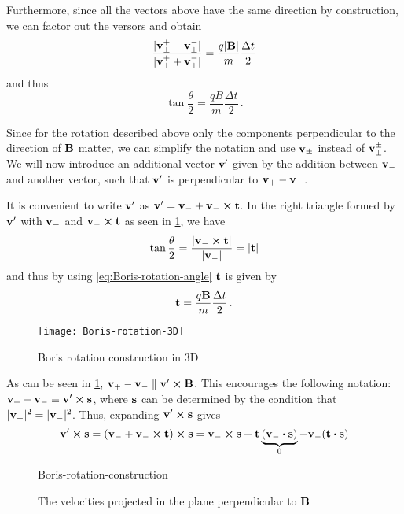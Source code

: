 \documentclass[12pt, class=report, crop=false]{standalone}
\begin{document}
Furthermore, since all the vectors above have the same direction by construction,
we can factor out the versors and obtain
\[
\frac{|\vb{v}^+_\perp - \vb{v}^-_\perp|}{|\vb{v}^+_\perp + \vb{v}^-_\perp|} =
\frac{q |\vb{B}|}{m} \frac{\Delta t}{2}
\]
and thus
\begin{equation}
  \label{eq:Boris-rotation-angle}
  \tan{\frac{\theta}{2}} = \frac{q B}{m} \frac{\Delta t}{2}\,.
\end{equation}

Since for the rotation described above only the components perpendicular to
the direction of \(\vb{B}\) matter, we can simplify the notation and use
\(\vb{v}_\pm\) instead of \(\vb{v}^\pm_\perp\).
We will now introduce an additional vector \(\vb{v}'\) given by the addition
between \(\vb{v}_-\) and another vector, such that \(\vb{v}'\) is perpendicular
to \(\vb{v}_+ - \vb{v}_-\).

It is convenient to write \(\vb{v}'\) as \(\vb{v}' = \vb{v}_- + \vb{v}_- \cp \vb{t}\).
In the right triangle formed by \(\vb{v}'\) with \(\vb{v}_-\)
and \(\vb{v}_- \cp \vb{t}\) as seen in \cref{fig:Boris-rotation-3D},
we have
\[
\tan{\frac{\theta}{2}} = \frac{|\vb{v}_- \cp \vb{t}|}{|\vb{v}_-|} = |\vb{t}|
\]
and thus by using \cref{eq:Boris-rotation-angle} \(\vb{t}\) is given by
\begin{equation}
  \label{eq:boris-t}
  \vb{t} = \frac{q \vb{B}}{m} \frac{\Delta t}{2}\,.
\end{equation}

\begin{figure}[H]
  \texttt{[image: Boris-rotation-3D]}
  \caption{Boris rotation construction in 3D}%
  \label{fig:Boris-rotation-3D}%
\end{figure}

As can be seen in \cref{fig:Boris-rotation-3D},
\(\vb{v}_+ - \vb{v}_- \parallel \vb{v}' \cp \vb{B}\). This encourages
the following notation: \(\vb{v}_+ - \vb{v}_- \equiv \vb{v}' \cp \vb{s}\),
where \(\vb{s}\) can be determined by the condition that
\(|\vb{v}_+|^2 = |\vb{v}_-|^2\). Thus, expanding \(\vb{v}' \cp \vb{s}\) gives
\[
\vb{v}' \cp \vb{s} = (\vb{v}_- + \vb{v}_- \cp \vb{t}) \cp \vb{s} =
\vb{v}_- \cp \vb{s} + \vb{t} \underbrace{(\vb{v}_- \vdot \vb{s})}_0 - \vb{v}_- (\vb{t} \vdot \vb{s})
\]

\begin{wrapfigure}[15]{r}{0.4\textwidth}
  \centering
  {Boris-rotation-construction}%
  \caption{The velocities projected in the plane perpendicular to \(\vb{B}\)}%
  \label{fig:Boris-rotation-construction}%
\end{wrapfigure}
\end{document}
